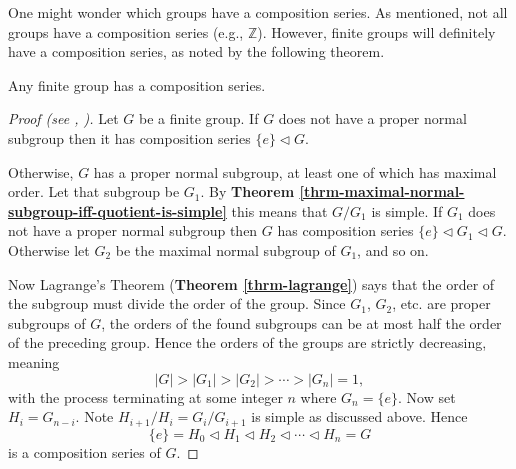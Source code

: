 One might wonder which groups have a composition series. As mentioned, not all groups have a composition series (e.g., $\mathbb{Z}$). However, finite groups will definitely have a composition series, as noted by the following theorem.
\begin{theorem}\label{thrm-finite-group-has-composition-series}
    Any finite group has a composition series.
\end{theorem}
\begin{proof}[Proof (see \cite{hungerford_1980}, \cite{proofwiki_finitegrouphascompositionseries})]
    Let $G$ be a finite group. If $G$ does not have a proper normal subgroup then it has composition series $\{e\} \lhd G$.
    
    Otherwise, $G$ has a proper normal subgroup, at least one of which has maximal order. Let that subgroup be $G_1$. By \textbf{Theorem \ref{thrm-maximal-normal-subgroup-iff-quotient-is-simple}} this means that $G/G_1$ is simple. If $G_1$ does not have a proper normal subgroup then $G$ has composition series $\{e\} \lhd G_1 \lhd G$. Otherwise let $G_2$ be the maximal normal subgroup of $G_1$, and so on. 
    
    Now Lagrange's Theorem (\textbf{Theorem \ref{thrm-lagrange}}) says that the order of the subgroup must divide the order of the group. Since $G_1$, $G_2$, etc. are proper subgroups of $G$, the orders of the found subgroups can be at most half the order of the preceding group. Hence the orders of the groups are strictly decreasing, meaning
    \[
        |G| > |G_1| > |G_2| > \cdots > |G_n| = 1,
    \]
    with the process terminating at some integer $n$ where $G_n = \{e\}$. Now set $H_i = G_{n-i}$. Note $H_{i+1}/H_i = G_i/G_{i+1}$ is simple as discussed above. Hence
    \[
        \{e\} = H_0 \lhd H_1 \lhd H_2 \lhd \cdots \lhd H_n = G    
    \]
    is a composition series of $G$.
\end{proof}

\newpage

